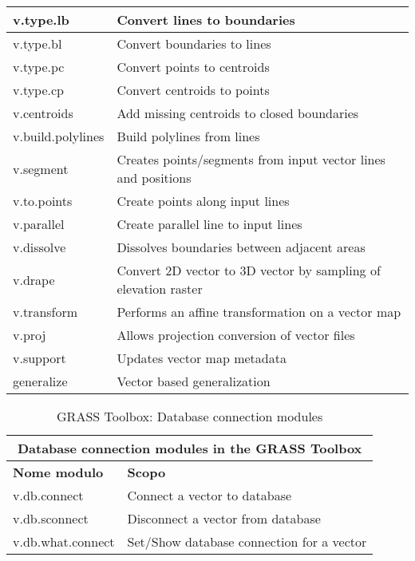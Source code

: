 \begin{table}[ht]
\begin{tabular}{|p{4cm}|p{12cm}|}
  \hline v.type.lb & Convert lines to boundaries \\
  \hline v.type.bl & Convert boundaries to lines \\
  \hline v.type.pc & Convert points to centroids \\
  \hline v.type.cp & Convert centroids to points \\
  \hline v.centroids & Add missing centroids to closed boundaries  \\
  \hline v.build.polylines & Build polylines from lines \\
  \hline v.segment & Creates points/segments from input vector lines and
  positions \\
  \hline v.to.points & Create points along input lines \\
  \hline v.parallel & Create parallel line to input lines \\
  \hline v.dissolve & Dissolves boundaries between adjacent areas \\
  \hline v.drape & Convert 2D vector to 3D vector by sampling of elevation
  raster\\
  \hline v.transform & Performs an affine transformation on a vector map \\
  \hline v.proj & Allows projection conversion of vector files \\
  \hline v.support & Updates vector map metadata \\
  \hline generalize & Vector based generalization \\
\hline
\end{tabular}
\end{table}

\begin{table}[ht]
\centering
\caption{GRASS Toolbox: Database connection modules}\medskip
 \begin{tabular}{|p{4cm}|p{12cm}|}
  \hline \multicolumn{2}{|c|}{\textbf{Database connection modules in the GRASS
  Toolbox}} \\
  \hline \textbf{Nome modulo} & \textbf{Scopo} \\
  \hline v.db.connect & Connect a vector to database \\
  \hline v.db.sconnect & Disconnect a vector from database \\
  \hline v.db.what.connect & Set/Show database connection for a vector \\
\hline
\end{tabular}
\end{table}

